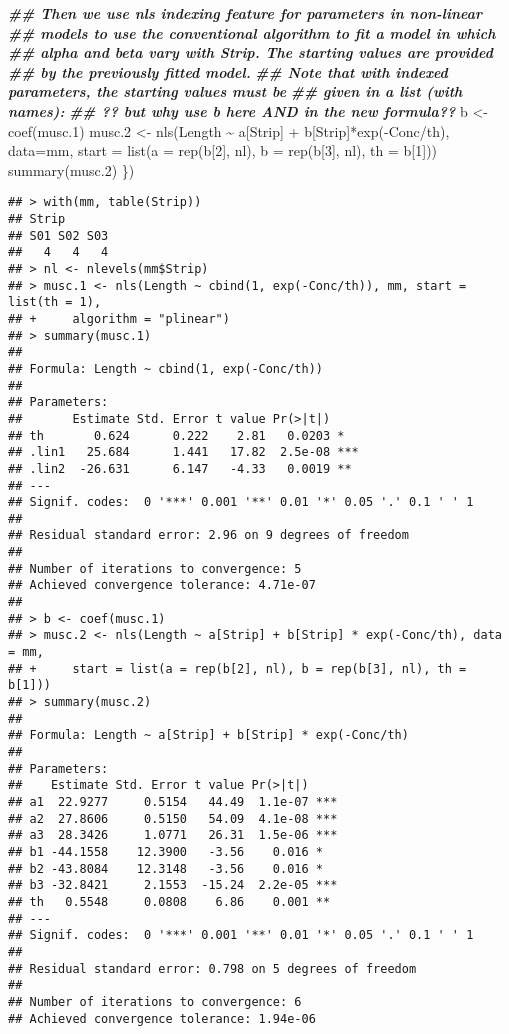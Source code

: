 \documentclass[
]{article}
\newenvironment{Shaded}{\begin{snugshade}}{\end{snugshade}}
\newcommand{\AttributeTok}[1]{\textcolor[rgb]{0.77,0.63,0.00}{#1}}
\newcommand{\DecValTok}[1]{\textcolor[rgb]{0.00,0.00,0.81}{#1}}
\newcommand{\DocumentationTok}[1]{\textcolor[rgb]{0.56,0.35,0.01}{\textbf{\textit{#1}}}}
\newcommand{\FloatTok}[1]{\textcolor[rgb]{0.00,0.00,0.81}{#1}}
\newcommand{\FunctionTok}[1]{\textcolor[rgb]{0.00,0.00,0.00}{#1}}
\newcommand{\NormalTok}[1]{#1}
\newcommand{\OtherTok}[1]{\textcolor[rgb]{0.56,0.35,0.01}{#1}}
\newcommand{\SpecialCharTok}[1]{\textcolor[rgb]{0.00,0.00,0.00}{#1}}
\begin{document}
\begin{Shaded}
\begin{Highlighting}[]
  \DocumentationTok{\#\# Then we use nls\textquotesingle{} indexing feature for parameters in non{-}linear}
  \DocumentationTok{\#\# models to use the conventional algorithm to fit a model in which}
  \DocumentationTok{\#\# alpha and beta vary with Strip.  The starting values are provided}
  \DocumentationTok{\#\# by the previously fitted model.}
  \DocumentationTok{\#\# Note that with indexed parameters, the starting values must be}
  \DocumentationTok{\#\# given in a list (with names):}
  \DocumentationTok{\#\# ?? but why use b here AND in the new formula??}
\NormalTok{  b }\OtherTok{\textless{}{-}} \FunctionTok{coef}\NormalTok{(musc}\FloatTok{.1}\NormalTok{)}
\NormalTok{  musc}\FloatTok{.2} \OtherTok{\textless{}{-}} \FunctionTok{nls}\NormalTok{(Length }\SpecialCharTok{\textasciitilde{}}\NormalTok{ a[Strip] }\SpecialCharTok{+}\NormalTok{ b[Strip]}\SpecialCharTok{*}\FunctionTok{exp}\NormalTok{(}\SpecialCharTok{{-}}\NormalTok{Conc}\SpecialCharTok{/}\NormalTok{th), }\AttributeTok{data=}\NormalTok{mm,}
                \AttributeTok{start =} \FunctionTok{list}\NormalTok{(}\AttributeTok{a =} \FunctionTok{rep}\NormalTok{(b[}\DecValTok{2}\NormalTok{], nl), }\AttributeTok{b =} \FunctionTok{rep}\NormalTok{(b[}\DecValTok{3}\NormalTok{], nl), }\AttributeTok{th =}\NormalTok{ b[}\DecValTok{1}\NormalTok{]))}
  \FunctionTok{summary}\NormalTok{(musc}\FloatTok{.2}\NormalTok{)}
\NormalTok{\})}
\end{Highlighting}
\end{Shaded}

\begin{verbatim}
## > with(mm, table(Strip))
## Strip
## S01 S02 S03 
##   4   4   4 
## > nl <- nlevels(mm$Strip)
## > musc.1 <- nls(Length ~ cbind(1, exp(-Conc/th)), mm, start = list(th = 1), 
## +     algorithm = "plinear")
## > summary(musc.1)
## 
## Formula: Length ~ cbind(1, exp(-Conc/th))
## 
## Parameters:
##       Estimate Std. Error t value Pr(>|t|)    
## th       0.624      0.222    2.81   0.0203 *  
## .lin1   25.684      1.441   17.82  2.5e-08 ***
## .lin2  -26.631      6.147   -4.33   0.0019 ** 
## ---
## Signif. codes:  0 '***' 0.001 '**' 0.01 '*' 0.05 '.' 0.1 ' ' 1
## 
## Residual standard error: 2.96 on 9 degrees of freedom
## 
## Number of iterations to convergence: 5 
## Achieved convergence tolerance: 4.71e-07
## 
## > b <- coef(musc.1)
## > musc.2 <- nls(Length ~ a[Strip] + b[Strip] * exp(-Conc/th), data = mm, 
## +     start = list(a = rep(b[2], nl), b = rep(b[3], nl), th = b[1]))
## > summary(musc.2)
## 
## Formula: Length ~ a[Strip] + b[Strip] * exp(-Conc/th)
## 
## Parameters:
##    Estimate Std. Error t value Pr(>|t|)    
## a1  22.9277     0.5154   44.49  1.1e-07 ***
## a2  27.8606     0.5150   54.09  4.1e-08 ***
## a3  28.3426     1.0771   26.31  1.5e-06 ***
## b1 -44.1558    12.3900   -3.56    0.016 *  
## b2 -43.8084    12.3148   -3.56    0.016 *  
## b3 -32.8421     2.1553  -15.24  2.2e-05 ***
## th   0.5548     0.0808    6.86    0.001 ** 
## ---
## Signif. codes:  0 '***' 0.001 '**' 0.01 '*' 0.05 '.' 0.1 ' ' 1
## 
## Residual standard error: 0.798 on 5 degrees of freedom
## 
## Number of iterations to convergence: 6 
## Achieved convergence tolerance: 1.94e-06
\end{verbatim}
\end{document}
